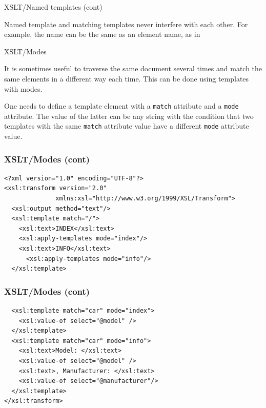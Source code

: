 %
\begin{frame}{XSLT/Named templates (cont)}

Named template and matching templates never interfere with each
other. For example, the name can be the same as an element name, as
in

\end{frame}

%
\begin{frame}{XSLT/Modes}

It is sometimes useful to traverse the same document several times and
match the same elements in a different way each time. This can be done
using templates with modes.

\bigskip

One needs to define a template element with a \texttt{match} attribute
and a \texttt{mode} attribute. The value of the latter can be any
string with the condition that two templates with the same
\texttt{match} attribute value have a different \texttt{mode}
attribute value.

\end{frame}

%
\begin{frame}[containsverbatim]
\frametitle{XSLT/Modes (cont)}

{\small
\begin{verbatim}
<?xml version="1.0" encoding="UTF-8"?>
<xsl:transform version="2.0"
              xmlns:xsl="http://www.w3.org/1999/XSL/Transform">
  <xsl:output method="text"/>
  <xsl:template match="/">
    <xsl:text>INDEX</xsl:text>
    <xsl:apply-templates mode="index"/>
    <xsl:text>INFO</xsl:text>
      <xsl:apply-templates mode="info"/>
  </xsl:template>
\end{verbatim}
}

\end{frame}

%
\begin{frame}[containsverbatim]
\frametitle{XSLT/Modes (cont)}

{\small
\begin{verbatim}
  <xsl:template match="car" mode="index">
    <xsl:value-of select="@model" />
  </xsl:template>
  <xsl:template match="car" mode="info">
    <xsl:text>Model: </xsl:text>
    <xsl:value-of select="@model" />
    <xsl:text>, Manufacturer: </xsl:text>
    <xsl:value-of select="@manufacturer"/>
  </xsl:template>
</xsl:transform>
\end{verbatim}
}

\end{frame}

